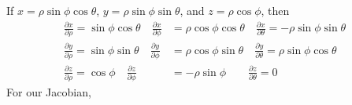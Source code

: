 \documentclass{article}
\begin{document}
If $x=\rho\sin\phi\cos\theta$, $y=\rho\sin\phi\sin\theta$, and $z=\rho \cos\phi$, then
\begin{align*}
    \frac{\partial x}{\partial \rho} = \sin\phi\cos\theta \hspace{1em}\frac{\partial x}{\partial \phi}& = \rho\cos\phi\cos\theta  \hspace{1em}\frac{\partial x}{\partial \theta} = -\rho \sin\phi\sin\theta\\
    \frac{\partial y}{\partial \rho} = \sin\phi\sin\theta \hspace{1em}\frac{\partial y}{\partial \phi}& = \rho\cos\phi\sin\theta  \hspace{1em}\frac{\partial y}{\partial \theta} = \rho \sin\phi\cos\theta\\
    \frac{\partial z}{\partial \rho} = \cos\phi \hspace{1em}\frac{\partial z}{\partial \phi}& = -\rho\sin\phi \hspace{2em}\frac{\partial z}{\partial \theta} =0
\end{align*}
For our Jacobian,
\end{document}
